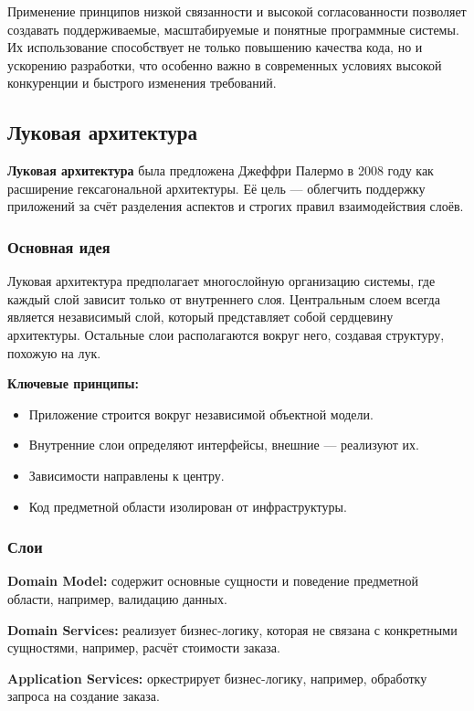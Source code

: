 Применение принципов низкой связанности и высокой согласованности позволяет создавать поддерживаемые, масштабируемые и понятные программные системы. Их использование способствует не только повышению качества кода, но и ускорению разработки, что особенно важно в современных условиях высокой конкуренции и быстрого изменения требований.





\subsection{Луковая архитектура}
\textbf{Луковая архитектура} была предложена Джеффри Палермо в 2008 году как расширение гексагональной архитектуры. Её цель — облегчить поддержку приложений за счёт разделения аспектов и строгих правил взаимодействия слоёв.

\subsubsection{Основная идея}
Луковая архитектура предполагает многослойную организацию системы, где каждый слой зависит только от внутреннего слоя. Центральным слоем всегда является независимый слой, который представляет собой сердцевину архитектуры. Остальные слои располагаются вокруг него, создавая структуру, похожую на лук.

\textbf{Ключевые принципы:}
\begin{itemize}
    \item Приложение строится вокруг независимой объектной модели.
    \item Внутренние слои определяют интерфейсы, внешние — реализуют их.
    \item Зависимости направлены к центру.
    \item Код предметной области изолирован от инфраструктуры.
\end{itemize}

\subsubsection{Слои}
\textbf{Domain Model:} содержит основные сущности и поведение предметной области, например, валидацию данных.

\textbf{Domain Services:} реализует бизнес-логику, которая не связана с конкретными сущностями, например, расчёт стоимости заказа.

\textbf{Application Services:} оркестрирует бизнес-логику, например, обработку запроса на создание заказа.

